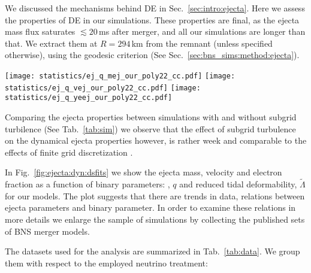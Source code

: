 We discussed the mechanisms behind \ac{DE} in Sec.~\ref{sec:intro:ejecta}. 
Here we assess the properties of \ac{DE} in our simulations. These properties 
are final, as the ejecta mass flux saturates ${\lesssim}20\,$ms after merger, 
and all our simulations are longer than that. We extract them at $R=294\,$km 
from the remnant (unless specified otherwise), using the geodesic criterion 
(See Sec.~\ref{sec:bns_sims:method:ejecta}). 

%
\begin{figure*}[t!]
    \centering 
    \texttt{[image: statistics/ej\_q\_mej\_our\_poly22\_cc.pdf]}
    \texttt{[image: statistics/ej\_q\_vej\_our\_poly22\_cc.pdf]}
    \texttt{[image: statistics/ej\_q\_yeej\_our\_poly22\_cc.pdf]}
    \caption{
        Mass, mass-averaged velocity and electron fraction for \ac{DE} 
        from our simulation as functions of binary parameters $q$ and $\tilde{\Lambda}$, 
        on the \textit{first}, \textit{second} and \textit{third} \textit{panels} 
        respectively. 
        In each panel, the lower suplot shows the relative difference 
        between the data and values inferred from the polynomial fitting 
        formula (see the text). 
        (Adapted from \citet{Nedora:2020pak})
    }
    \label{fig:ejecta:dyn:dsfits}
\end{figure*}
%
Comparing the ejecta properties between simulations with and 
without subgrid turbilence (See Tab.~\ref{tab:sim}) we observe 
that the effect of subgrid turbulence on the dynamical 
ejecta properties however, is rather week and comparable to the effects 
of finite grid discretization 
\citep{Bernuzzi:2020txg,Radice:2020ids}.

In Fig.~\ref{fig:ejecta:dyn:dsfits} we show the ejecta mass, velocity and 
electron fraction as a function of binary parameters: \mr{}, $q$ and 
reduced tidal deformability, $\tilde{\Lambda}$ for our models. 
The plot suggests that there are trends in data, relations between ejecta 
parameters and binary parameter. 
%
In order to examine these relations in more details we enlarge the sample 
of simulations by collecting the published sets of \ac{BNS} merger models.
%
%

%
The datasets used for the analysis are summarized in Tab.~\ref{tab:data}.
We group them with respect to the employed neutrino treatment:

